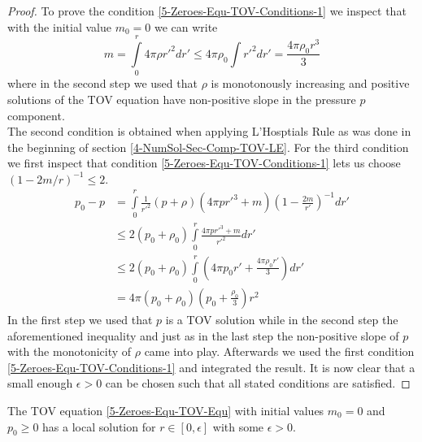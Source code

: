 \begin{proof}
	To prove the condition \eqref{5-Zeroes-Equ-TOV-Conditions-1} we inspect that with the initial value $m_0=0$ we can write
	\begin{equation}
		m = \int\limits_0^r 4\pi\rho r'^2dr'\leq4\pi\rho_0\int\limits r'^2dr'=\frac{4\pi\rho_0r^3}{3}
	\end{equation}
	where in the second step we used that $\rho$ is monotonously increasing and positive solutions of the \ac{TOV} equation have non-positive slope in the pressure $p$ component.\\
	The second condition is obtained when applying L'Hosptials Rule as was done in the beginning of section \ref{4-NumSol-Sec-Comp-TOV-LE}.
	For the third condition we first inspect that condition \ref{5-Zeroes-Equ-TOV-Conditions-1} lets us choose $(1-2m/r)^{-1}\leq 2$.
	\begin{align}
		p_0 - p &=\int\limits_0^r\frac{1}{r'^2}\left(p+\rho\right)\left(4\pi pr'^3+m\right)\left(1-\frac{2m}{r'}\right)^{-1}dr'\\
				&\leq2\left(p_0+\rho_0\right)\int\limits_0^r\frac{4\pi pr'^3+m}{r'^2}dr'\\
				&\leq2(p_0+\rho_0)\int\limits_0^r\left(4\pi p_0r' + \frac{4\pi\rho_0r'}{3}\right)dr'\\
				&=4\pi(p_0+\rho_0)\left(p_0+\frac{\rho_0}{3}\right)r^2
	\end{align}
	In the first step we used that $p$ is a \ac{TOV} solution while in the second step the aforementioned inequality and just as in the last step the non-positive slope of $p$ with the monotonicity of $\rho$ came into play.
	Afterwards we used the first condition \ref{5-Zeroes-Equ-TOV-Conditions-1} and integrated the result.
	It is now clear that a small enough $\epsilon>0$ can be chosen such that all stated conditions are satisfied.
\end{proof}
\begin{lemma}
	The \ac{TOV} equation \ref{5-Zeroes-Equ-TOV-Equ} with initial values $m_0=0$ and $p_0\geq0$ has a local solution for $r\in[0,\epsilon]$ with some $\epsilon>0$.
\end{lemma}
